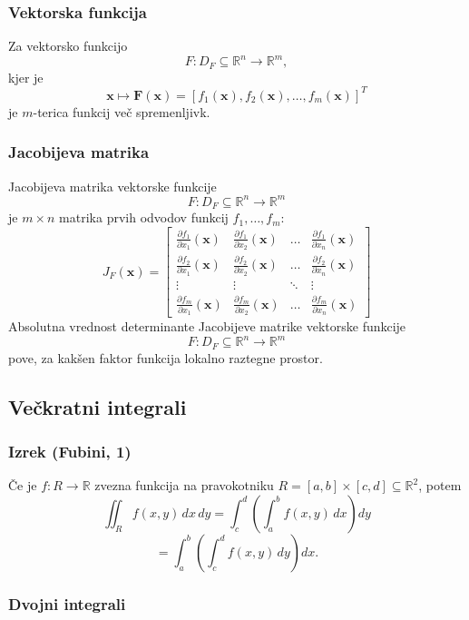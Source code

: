 \documentclass{article}
\begin{document}
\begin{multicols}{2}
\subsubsection{Vektorska funkcija}
Za vektorsko funkcijo 
\[ F: D_F \subseteq \mathbb{R}^n \rightarrow \mathbb{R}^m, \]
kjer je
\[ \mathbf{x} \mapsto \mathbf{F}(\mathbf{x}) = [f_1(\mathbf{x}), f_2(\mathbf{x}), \ldots, f_m(\mathbf{x})]^T \]
je \( m \)-terica funkcij več spremenljivk.

\subsubsection{Jacobijeva matrika}
Jacobijeva matrika vektorske funkcije 
\[ F: D_F \subseteq \mathbb{R}^n \rightarrow \mathbb{R}^m \]
je \( m \times n \) matrika prvih odvodov funkcij \( f_1, \ldots, f_m \):
\[ 
J_F(\mathbf{x}) = \begin{bmatrix}
\frac{\partial f_1}{\partial x_1}(\mathbf{x}) & \frac{\partial f_1}{\partial x_2}(\mathbf{x}) & \ldots & \frac{\partial f_1}{\partial x_n}(\mathbf{x}) \\
\frac{\partial f_2}{\partial x_1}(\mathbf{x}) & \frac{\partial f_2}{\partial x_2}(\mathbf{x}) & \ldots & \frac{\partial f_2}{\partial x_n}(\mathbf{x}) \\
\vdots & \vdots & \ddots & \vdots \\
\frac{\partial f_m}{\partial x_1}(\mathbf{x}) & \frac{\partial f_m}{\partial x_2}(\mathbf{x}) & \ldots & \frac{\partial f_m}{\partial x_n}(\mathbf{x})
\end{bmatrix}
\]
Absolutna vrednost determinante Jacobijeve matrike vektorske funkcije 
\[ F: D_F \subseteq \mathbb{R}^n \rightarrow \mathbb{R}^m \]
pove, za kakšen faktor funkcija lokalno raztegne prostor.

\subsection{Večkratni integrali}

\subsubsection{Izrek (Fubini, 1)} 
Če je \( f: R \rightarrow \mathbb{R} \) zvezna funkcija na pravokotniku \( R = [a, b] \times [c, d] \subseteq \mathbb{R}^2 \), potem
\[
\iint_R f(x,y) \,dx\,dy = \int_c^d \left( \int_a^b f(x,y) \,dx \right) dy
\]
\[
= \int_a^b \left( \int_c^d f(x,y) \,dy \right) dx.
\]


\subsubsection{Dvojni integrali}


\end{multicols}
\end{document}
